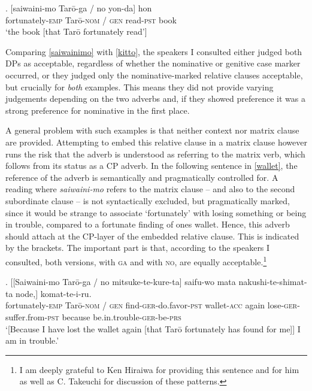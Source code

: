 \documentclass [output=book,colorlinks,citecolor=brown]{langscibook}
\begin{document}
\exg. [saiwaini-mo Tarō-ga / no yon-da] hon\\
fortunately-\textsc{emp} Tarō-\textsc{nom} / \textsc{gen} read-\textsc{pst} book\\
`the book [that Tarō fortunately read’] \label{saiwainimo}

Comparing \ref{saiwainimo} with \ref{kitto}, the speakers I consulted either judged both DPs as acceptable, regardless of whether the nominative or genitive case marker occurred, or they judged only the nominative-marked relative clauses acceptable, but crucially for \textit{both} examples. This means they did not provide varying judgements depending on the two adverbs and, if they showed preference it was a strong preference for nominative in the first place. %

A general problem with such examples is that neither context nor matrix clause are provided. Attempting to embed this relative clause in a matrix clause however runs the risk that the adverb is understood as referring to the matrix verb, which follows from its status as a CP adverb. In the following sentence in \ref{wallet}, the reference of the adverb is semantically and pragmatically controlled for. A reading where \textit{saiwaini-mo} refers to the matrix clause -- and also to the second subordinate clause -- is not syntactically excluded, but pragmatically marked, since it would be strange to associate `fortunately' with losing something or being in trouble, compared to a fortunate finding of ones wallet. Hence, this adverb should attach at the CP-layer of the embedded relative clause. This is indicated by the brackets. The important part is that, according to the speakers I consulted, both versions, with \textsc{ga} and with \textsc{no}, are equally acceptable.\footnote{I am deeply grateful to Ken Hiraiwa for providing this sentence and for him as well as C. Takeuchi for discussion of these patterns.} %

\exg. [[Saiwaini-mo Tarō-ga / no mitsuke-te-kure-ta] saifu-wo mata nakushi-te-shimat-ta node,] komat-te-i-ru.\\
fortunately-\textsc{emp} Tarō-\textsc{nom} / \textsc{gen} find-\textsc{ger}-do.favor-\textsc{pst} wallet-\textsc{acc} again lose-\textsc{ger}-suffer.from-\textsc{pst} because be.in.trouble-\textsc{ger}-be-\textsc{prs}\\
`[Because I have lost the wallet again [that Tarō fortunately has found for me]] I am in trouble.' \label{wallet}
\end{document}
